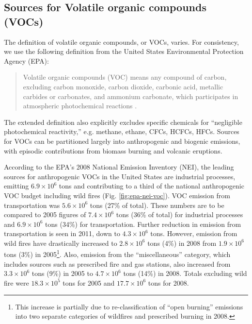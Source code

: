 \subsection{Sources for Volatile organic compounds (VOCs)} \label{ssec:intro/ozone/voc}

	The definition of volatile organic compounds, or VOCs, varies. For consistency, we use the following definition from the United States Environmental Protection Agency (EPA):
	\begin{quotation}
		Volatile organic compounds (VOC) means any compound of carbon, excluding carbon monoxide, carbon dioxide, carbonic acid, metallic carbides or carbonates, and ammonium carbonate, which participates in atmospheric photochemical reactions \citep{EPA:2012qy}.
	\end{quotation}
	The extended definition also explicitly excludes specific chemicals for ``negligible photochemical reactivity,'' e.g. methane, ethane, CFCs, HCFCs, HFCs. Sources for VOCs can be partitioned largely into anthropogenic and biogenic emissions, with episodic contributions from biomass burning and volcanic eruptions.


	According to the EPA's 2008 National Emission Inventory (NEI), the leading sources for anthropogenic VOCs in the United States are industrial processes, emitting $6.9\times10^6$ tons and contributing to a third of the national anthropogenic VOC budget including wild fires (Fig. \ref{fig:epa-nei-voc}). VOC emission from transportation was $5.6\times10^6$ tons (27\% of total). These numbers are to be compared to 2005 figures of $7.4\times10^6$ tons (36\% of total) for industrial processes and $6.9\times10^6$ tons (34\%) for transportation. Further reduction in emission from transportation is seen in 2011, down to $4.3\times10^6$ tons. However, emission from wild fires have drastically increased to $2.8\times10^6$ tons (4\%) in 2008 from $1.9\times10^6$ tons (3\%) in 2005\footnote{This increase is partially due to re-classification of ``open burning'' emissions into two separate categories of wildfires and prescribed burning in 2008.}. Also, emission from the ``miscellaneous'' category, which includes sources such as prescribed fire and gas stations, also increased from $3.3\times10^6$ tons (9\%) in 2005 to $4.7\times10^6$ tons (14\%) in 2008. Totals excluding wild fire were $18.3\times10^5$ tons for 2005 and $17.7\times10^6$ tons for 2008.


